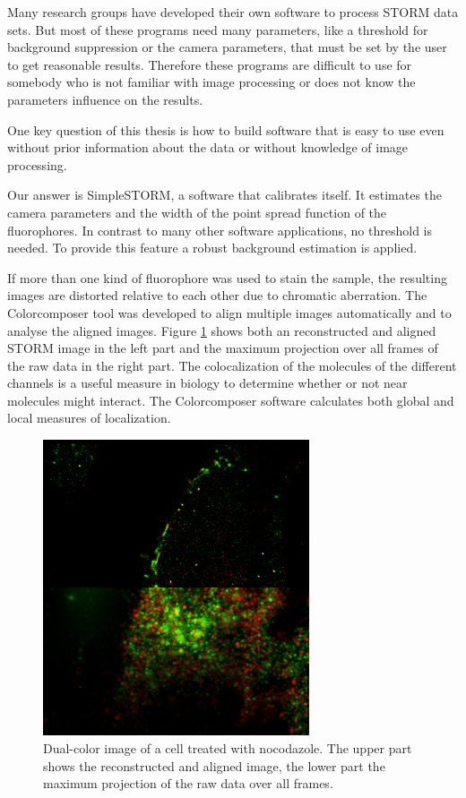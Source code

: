 Many research groups have developed their own software to process STORM data sets. But most of these programs need many parameters, like a threshold for background suppression or the camera parameters, that must be set by the user to get reasonable results. Therefore these programs are difficult to use for somebody who is not familiar with image processing or does not know the parameters influence on the results.\newline

One key question of this thesis is how to build software that is easy to use even without prior information about the data or without knowledge of image processing. \newline

Our answer is SimpleSTORM, a software that calibrates itself. It estimates the camera parameters and the width of the point spread function of the fluorophores. In contrast to many other software applications, no threshold is needed. To provide this feature a robust background estimation is applied.\newline

If more than one kind of fluorophore was used to stain the sample, the resulting images are distorted relative to each other due to chromatic aberration. The Colorcomposer tool was developed to align multiple images automatically and to analyse the aligned images. Figure \ref{dualcolor} shows both an reconstructed and aligned STORM image in the left part and the maximum projection over all frames of the raw data in the right part. The colocalization of the molecules of the different channels is a useful measure in biology to determine whether or not near molecules might interact. The Colorcomposer software calculates both global and local measures of localization.

\begin{figure}
\centering
\includegraphics[width = 0.7\textwidth,angle=90]{pictures/alignedStormWidefield.png}
	\caption{Dual-color image of a cell treated with nocodazole. The upper part shows the reconstructed and aligned image, the lower part the maximum projection of the raw data over all frames.}
	\label{dualcolor}
\end{figure}



